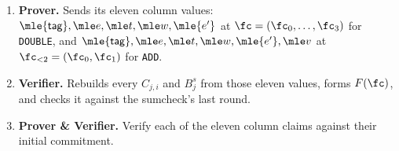 \begin{enumerate}[itemsep=1pt,topsep=3pt]
They run over different cubes, $\cube{4}$ for \texttt{DOUBLE} and $\cube{2}$ for \texttt{ADD}, so \texttt{ADD}'s part is multiplied by $X_2X_3$, the two variables it does not use, whose sum over $\cube{2}$ is $1$ and so leaves its own sum untouched:
\begin{align*}
  F(X_0,\dots,X_3)&=\eq\bigl(\zeta_{<4},(X_0,\dots,X_3)\bigr)\Bigl(\xi^{0}C_{1,1}+\xi^{1}C_{1,2}+\xi^{5}B^{\push}_{1}+\xi^{6}B^{\pull}_{1}\Bigr)\\
                  &\quad+\eq\bigl(\zeta_{<2},(X_0,X_1)\bigr)\Bigl(\xi^{2}C_{2,1}+\xi^{3}C_{2,2}+\xi^{4}C_{2,3}+\xi^{5}B^{\push}_{2}+\xi^{6}B^{\pull}_{2}\Bigr)X_2X_3 .
\end{align*}
One sumcheck over $\cube{4}$ then proves all seven claims at once:
\[
  \sum_{x\in\cube{4}}F(x)\qeq\xi^{5}\mathsf{rem}_{\push}+\xi^{6}\mathsf{rem}_{\pull}.
\]
\item \textbf{Prover.} Sends its eleven column values: $\mle{\mathsf{tag}},\mle e,\mle t,\mle w,\mle{e'}$ at $\fc=(\fc_0,\dots,\fc_3)$ for \texttt{DOUBLE}, and $\mle{\mathsf{tag}},\mle e,\mle t,\mle w,\mle{e'},\mle v$ at $\fc_{<2}=(\fc_0,\fc_1)$ for \texttt{ADD}.
\item \textbf{Verifier.} Rebuilds every $C_{j,i}$ and $B^{s}_{j}$ from those eleven values, forms $F(\fc)$, and checks it against the sumcheck's last round.
\item \textbf{Prover \& Verifier.} Verify each of the eleven column claims against their initial commitment.
\end{enumerate}
